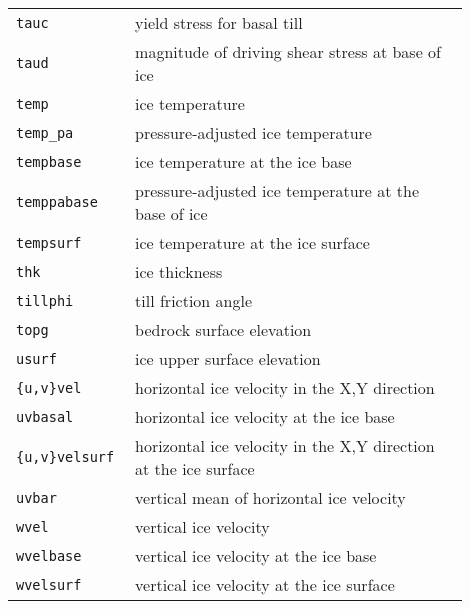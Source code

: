 \documentclass[landscape]{article}
\begin{document}
\begin{textblock}{15}
\begin{tabular}{@{}p{0.2\linewidth}p{0.7\linewidth}@{}}
  \texttt{tauc} &  yield stress for basal till \\
  \texttt{taud} &  magnitude of driving shear stress at base of ice \\
  \texttt{temp} &  ice temperature \\
  \texttt{temp_pa} &  pressure-adjusted ice temperature \\
  \texttt{tempbase} &  ice temperature at the ice base\\
  \texttt{temppabase} &  pressure-adjusted ice temperature at the base of ice\\
  \texttt{tempsurf} &  ice temperature at the ice surface\\
  \texttt{thk} &  ice thickness\\
  \texttt{tillphi} &  till friction angle \\
  \texttt{topg} &  bedrock surface elevation \\
  \texttt{usurf} &  ice upper surface elevation \\
  \texttt{\{u,v\}vel} &  horizontal ice velocity in the X,Y direction \\
  \texttt{uvbasal} &  horizontal  ice velocity at the ice base\\
  \texttt{\{u,v\}velsurf} &  horizontal ice velocity in the X,Y direction
  at the ice surface\\
  \texttt{uvbar} &  vertical mean of horizontal ice velocity\\
  \texttt{wvel} &  vertical ice velocity \\
  \texttt{wvelbase} &  vertical ice velocity at the ice base\\
  \texttt{wvelsurf} &  vertical ice velocity at the ice surface\\
  \end{tabular}

\end{textblock}
\end{document}
